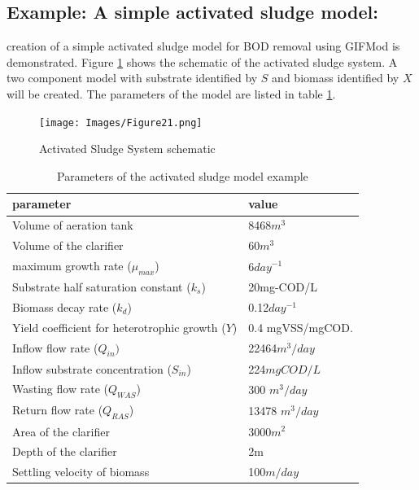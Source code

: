 \subsection{Example: A simple activated sludge model: } 
 creation of a simple activated sludge model for BOD removal using GIFMod is demonstrated. Figure \ref{fig:21} shows the schematic of the activated sludge system. A two component model with substrate identified by $S$ and biomass identified by $X$ will be created. The parameters of the model are listed in table \ref{table:ASM}.  
 
\begin{figure}[!ht]\label{fig:21}
\begin{center}
\texttt{[image: Images/Figure21.png]} \\
\caption{Activated Sludge System schematic} 
\end{center}
\end{figure}
 
 
\begin{table}
\caption{Parameters of the activated sludge model example}
\begin{tabular}{l l}\label{table:ASM}
parameter & value \\
\hline
Volume of aeration tank & 8468$m^3$ \\
Volume of the clarifier & 60$m^3$ \\
maximum growth rate ($\mu_{max}$) & 6$day^{-1}$ \\
Substrate half saturation constant ($k_s$) & 20mg-COD/L \\
Biomass decay rate ($k_d$) & 0.12$day^{-1}$ \\
Yield coefficient for heterotrophic growth ($Y$) & 0.4  mgVSS/mgCOD. \\
Inflow flow rate ($Q_{in})$ & 22464$m^3/day$ \\
Inflow substrate concentration ($S_{in}$) & 224$mgCOD/L$ \\
Wasting flow rate ($Q_{WAS}$) & 300 $m^3/day$ \\
Return flow rate ($Q_{RAS}$) & 13478 $m^3/day$ \\
Area of the clarifier & 3000$m^2$ \\
Depth of the clarifier & 2m \\
Settling velocity of biomass & 100$m/day$ \\
 \end{tabular}\\
\end{table}

